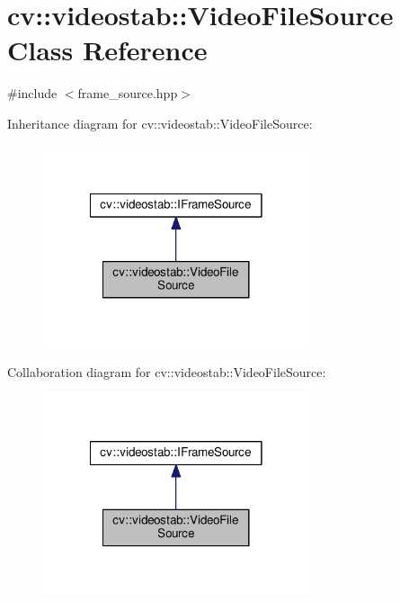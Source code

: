 \hypertarget{classcv_1_1videostab_1_1VideoFileSource}{\section{cv\-:\-:videostab\-:\-:Video\-File\-Source Class Reference}
\label{classcv_1_1videostab_1_1VideoFileSource}
}


{\ttfamily \#include $<$frame\-\_\-source.\-hpp$>$}



Inheritance diagram for cv\-:\-:videostab\-:\-:Video\-File\-Source\-:\nopagebreak
\begin{figure}[H]
\begin{center}
\leavevmode
\includegraphics[width=222pt]{classcv_1_1videostab_1_1VideoFileSource__inherit__graph}
\end{center}
\end{figure}


Collaboration diagram for cv\-:\-:videostab\-:\-:Video\-File\-Source\-:\nopagebreak
\begin{figure}[H]
\begin{center}
\leavevmode
\includegraphics[width=222pt]{classcv_1_1videostab_1_1VideoFileSource__coll__graph}
\end{center}
\end{figure}
